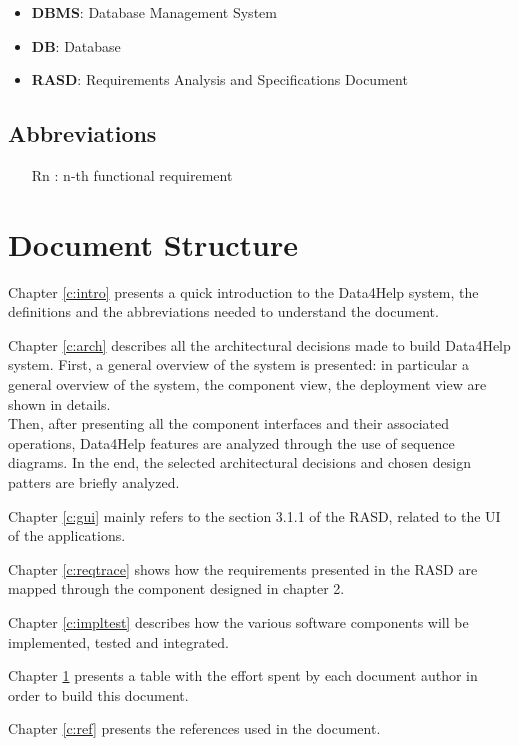 \begin{itemize}
\item \textbf{DBMS}: Database Management System
\item \textbf{DB}: Database
\item \textbf{RASD}: Requirements Analysis and Specifications Document
\end{itemize}


\subsection{Abbreviations}
\begin{itemize}
\item[Rn]: n-th functional requirement
\end{itemize}



\section{Document Structure}
Chapter \ref{c:intro} presents a quick introduction to the Data4Help system, the definitions and the abbreviations needed to understand the document. 

\bigskip\noindent
Chapter \ref{c:arch} describes all the architectural decisions made to build Data4Help system. First, a general overview of the system is presented: in particular a general overview of the system, the component view, the deployment view are shown in details.\\
Then, after presenting all the component interfaces and their associated operations, Data4Help features are analyzed through the use of sequence diagrams.
In the end, the selected architectural decisions and chosen design patters are briefly analyzed.

\bigskip\noindent
Chapter \ref{c:gui} mainly refers to the section 3.1.1 of the RASD, related to the UI of the applications.

\bigskip\noindent
Chapter \ref{c:reqtrace} shows how the requirements presented in the RASD are mapped through the component designed in chapter 2.



\bigskip\noindent
Chapter \ref{c:impltest} describes how the various software components will be implemented, tested and integrated.

\bigskip\noindent
Chapter \ref{} presents a table with the effort spent by each document author in order to build this document.

\bigskip\noindent
Chapter \ref{c:ref} presents the references used in the document.
